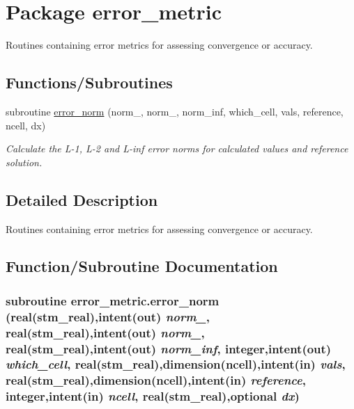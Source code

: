 \hypertarget{a00058}{
\section{Package error\_\-metric}
\label{a00058}
}
Routines containing error metrics for assessing convergence or accuracy.  


\subsection*{Functions/Subroutines}
\begin{CompactItemize}
\item 
subroutine \hyperlink{a00058_a897ebafccff7f7d25e580f3cfd67dd4}{error\_\-norm} (norm\_, norm\_, norm\_\-inf, which\_\-cell, vals, reference, ncell, dx)
\begin{CompactList}\small\item\em Calculate the L-1, L-2 and L-inf error norms for calculated values and reference solution. \item\end{CompactList}\end{CompactItemize}


\subsection{Detailed Description}
Routines containing error metrics for assessing convergence or accuracy. 



\subsection{Function/Subroutine Documentation}
\hypertarget{a00058_a897ebafccff7f7d25e580f3cfd67dd4}{
\subsubsection[{error\_\-norm}]{\setlength{\rightskip}{0pt plus 5cm}subroutine error\_\-metric.error\_\-norm (real(stm\_\-real),intent(out) {\em norm\_}, \/  real(stm\_\-real),intent(out) {\em norm\_}, \/  real(stm\_\-real),intent(out) {\em norm\_\-inf}, \/  integer,intent(out) {\em which\_\-cell}, \/  real(stm\_\-real),dimension(ncell),intent(in) {\em vals}, \/  real(stm\_\-real),dimension(ncell),intent(in) {\em reference}, \/  integer,intent(in) {\em ncell}, \/  real(stm\_\-real),optional {\em dx})}}
\label{a00058_a897ebafccff7f7d25e580f3cfd67dd4}


